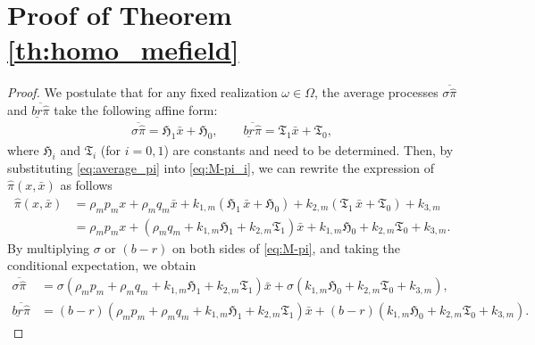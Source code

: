 \documentclass[11pt]{article}
\numberwithin{equation}{section}
\renewcommand{\theequation}{\arabic{section}.\arabic{equation}}
\begin{document}
\section{Proof of Theorem \ref{th:homo_mefield}}\label{app:homo_mf}
\setcounter{equation}{0}
\renewcommand{\theequation}{D.\arabic{equation}}
	\begin{proof}
We postulate that for any fixed realization \(\omega \in \Omega\), the average processes \(\overline{\sigma\widehat{\pi}}\) and \(\overline{\underline{br}\widehat{\pi}}\) take the following affine form:
	\begin{align}\label{eq:average_pi}
		\overline{\sigma\hat{\pi}}  = \mathfrak{H}_1\bar{x}  + \mathfrak{H}_0,
		\qquad
		\overline{\underline{br}\hat{\pi}} = \mathfrak{T}_1\bar{x}  + \mathfrak{T}_0,
	\end{align}
	where  $\mathfrak{H}_i$ and \(\mathfrak{T}_i\) (for \(i=0,1\)) are constants and need to be determined.
Then, by substituting \eqref{eq:average_pi} into \eqref{eq:M-pi_i}, we can rewrite the expression of \(\widehat{\pi}(x,\bar{x})\) as follows
\begin{align}
\widehat{\pi}(x, \bar{x})&= \rho_{\scriptscriptstyle m} p_{\scriptscriptstyle m} x + \rho_{\scriptscriptstyle m} q_{\scriptscriptstyle m} \bar{x} + k_{1,\scriptscriptstyle m} \left(\mathfrak{H}_1\,\bar{x} +\mathfrak{H}_0\right)+ k_{2,\scriptscriptstyle m}\left(\mathfrak{T}_1\,\bar{x} + \mathfrak{T}_0\right) +k_{3,\scriptscriptstyle m}\\
		&=\rho_{\scriptscriptstyle m}p_{\scriptscriptstyle m} x+\left(\rho_{\scriptscriptstyle m} q_{\scriptscriptstyle m} +k_{1,\scriptscriptstyle m}\mathfrak{H}_1+k_{2,\scriptscriptstyle m}\mathfrak{T}_1\right)\bar{x}+k_{1,\scriptscriptstyle m}\mathfrak{H}_0+k_{2,\scriptscriptstyle m}\mathfrak{T}_0+k_{3,\scriptscriptstyle m}. \label{eq:M-pi}
	\end{align}
By multiplying $\sigma$ or $(b-r)$ on both sides of \eqref{eq:M-pi}, and taking the conditional expectation, we obtain
\begin{align*}
\overline{\sigma\widehat{\pi}}&=\sigma\left(\rho_{\scriptscriptstyle m}p_{\scriptscriptstyle m}+\rho_{\scriptscriptstyle m} q_{\scriptscriptstyle m} +k_{1,\scriptscriptstyle m}\mathfrak{H}_1+k_{2,\scriptscriptstyle m}\mathfrak{T}_1\right)\bar{x}+\sigma \left(k_{1,\scriptscriptstyle m}\mathfrak{H}_0+k_{2,\scriptscriptstyle m}\mathfrak{T}_0+k_{3,\scriptscriptstyle m}\right),\\
\overline{\underline{br}\widehat{\pi}}&=(b-r)\left(\rho_{\scriptscriptstyle m}p_{\scriptscriptstyle m}+\rho_{\scriptscriptstyle m} q_{\scriptscriptstyle m} +k_{1,\scriptscriptstyle m}\mathfrak{H}_1+k_{2,\scriptscriptstyle m}\mathfrak{T}_1\right)\bar{x}+(b-r) \left(k_{1,\scriptscriptstyle m}\mathfrak{H}_0+k_{2,\scriptscriptstyle m}\mathfrak{T}_0+k_{3,\scriptscriptstyle m}\right).

\end{align*}
\end{proof}
\end{document}

